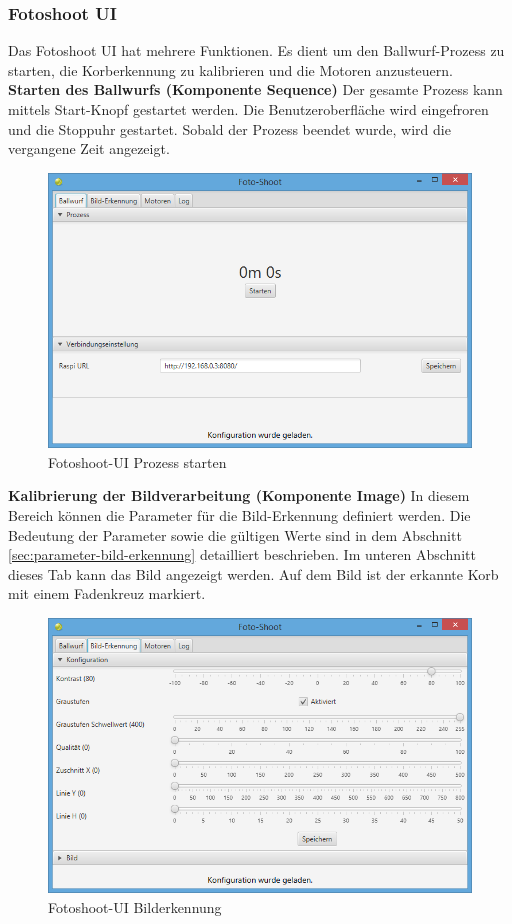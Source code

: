 \subsubsection{Fotoshoot UI}

Das Fotoshoot UI hat mehrere Funktionen. Es dient um den Ballwurf-Prozess zu starten, die Korberkennung zu kalibrieren und die Motoren anzusteuern.\\

\noindent
\textbf{Starten des Ballwurfs (Komponente Sequence)}
Der gesamte Prozess kann mittels Start-Knopf gestartet werden. Die Benutzeroberfläche wird eingefroren und die Stoppuhr gestartet. Sobald der Prozess beendet wurde, wird die vergangene Zeit angezeigt.

\begin{figure}[h!]
\centering
\includegraphics[width=0.6\linewidth]{../../fig/fotoshoot-ui/fotoshoot-ui-pi}
\caption{Fotoshoot-UI Prozess starten}
\label{fig:fotoshoot-ui-pi}
\end{figure}

\noindent
\textbf{Kalibrierung der Bildverarbeitung (Komponente Image)}
In diesem Bereich können die Parameter für die Bild-Erkennung definiert werden. Die Bedeutung der Parameter sowie die gültigen Werte sind in dem Abschnitt \ref{sec:parameter-bild-erkennung} detailliert beschrieben. Im unteren Abschnitt dieses Tab kann das Bild angezeigt werden. Auf dem Bild ist der erkannte Korb mit einem Fadenkreuz markiert.

\begin{figure}[h!]
	\centering
	\includegraphics[width=0.6\linewidth]{../../fig/fotoshoot-ui/fotoshoot-ui-korb-erkennung}
	\caption{Fotoshoot-UI Bilderkennung}
	\label{fig:fotoshoot-ui-korb-erkennung}
\end{figure}

